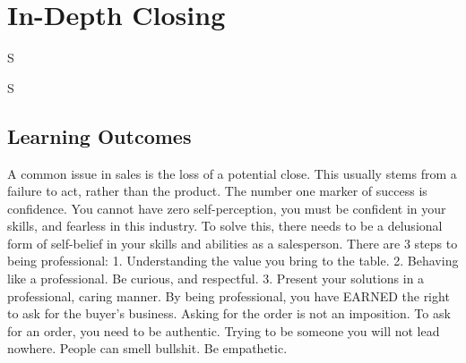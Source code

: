 \frenchspacing
\chapter{In-Depth Closing}
\epigraph{S}{S}

%
\section{Learning Outcomes}

A common issue in sales is the loss of a potential close. This usually stems from a failure to act, rather than the product. The number one marker of success is confidence. You cannot have zero self-perception, you must be confident in your skills, and fearless in this industry.
To solve this, there needs to be a delusional form of self-belief in your skills and abilities as a salesperson.
There are 3 steps to being professional:
1.	Understanding the value you bring to the table. 
2.	Behaving like a professional. Be curious, and respectful. 
3.	Present your solutions in a professional, caring manner.
By being professional, you have EARNED the right to ask for the buyer’s business. Asking for the order is not an imposition. 
To ask for an order, you need to be authentic. Trying to be someone you will not lead nowhere. People can smell bullshit. Be empathetic. 

%
\printbibliography[heading=secbibliography, title={References}]